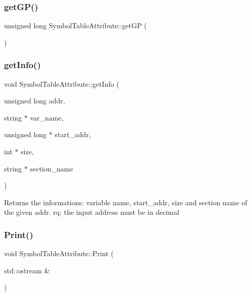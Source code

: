 \subsubsection{\texorpdfstring{get\+G\+P()}{getGP()}}
{\footnotesize\ttfamily unsigned long Symbol\+Table\+Attribute\+::get\+GP (\begin{DoxyParamCaption}{ }\end{DoxyParamCaption})}

\mbox{\label{classSymbolTableAttribute_a6b87c838b987ba648eed8423323b5bf2}} 
\subsubsection{\texorpdfstring{get\+Info()}{getInfo()}}
{\footnotesize\ttfamily void Symbol\+Table\+Attribute\+::get\+Info (\begin{DoxyParamCaption}\item[{unsigned long}]{addr,  }\item[{string $\ast$}]{var\+\_\+name,  }\item[{unsigned long $\ast$}]{start\+\_\+addr,  }\item[{int $\ast$}]{size,  }\item[{string $\ast$}]{section\+\_\+name }\end{DoxyParamCaption})}

Returns the informations\+: variable name, start\+\_\+addr, size and section name of the given addr. rq\+: the input address must be in decimal \mbox{\label{classSymbolTableAttribute_ab456077a4c556eec9ad24103689aa672}} 
\subsubsection{\texorpdfstring{Print()}{Print()}}
{\footnotesize\ttfamily void Symbol\+Table\+Attribute\+::\+Print (\begin{DoxyParamCaption}\item[{std\+::ostream \&}]{ }\end{DoxyParamCaption})}

\mbox{\label{classSymbolTableAttribute_ae3a962fbcb5eebcf2f5b9b25814d6714}} 
